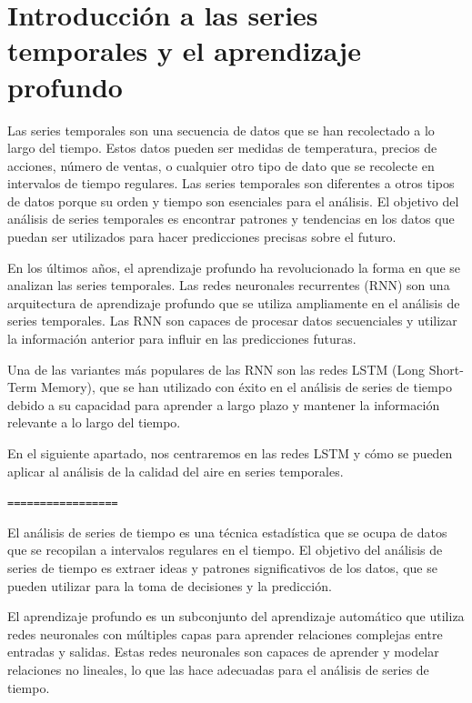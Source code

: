\documentclass[11pt]{article}
\date{}
\title{}
\begin{document}
\setcounter{tocdepth}{3}
\tableofcontents

\setlength\parindent{10pt}


\section{Introducción a las series temporales y el aprendizaje profundo}
\label{sec:org1295288}
Las series temporales son una secuencia de datos que se han
recolectado a lo largo del tiempo. Estos datos pueden ser medidas de
temperatura, precios de acciones, número de ventas, o cualquier otro
tipo de dato que se recolecte en intervalos de tiempo regulares. Las
series temporales son diferentes a otros tipos de datos porque su
orden y tiempo son esenciales para el análisis. El objetivo del
análisis de series temporales es encontrar patrones y tendencias en
los datos que puedan ser utilizados para hacer predicciones precisas
sobre el futuro.

En los últimos años, el aprendizaje profundo ha revolucionado la forma
en que se analizan las series temporales. Las redes neuronales
recurrentes (RNN) son una arquitectura de aprendizaje profundo que se
utiliza ampliamente en el análisis de series temporales. Las RNN son
capaces de procesar datos secuenciales y utilizar la información
anterior para influir en las predicciones futuras.

Una de las variantes más populares de las RNN son las redes LSTM (Long
Short-Term Memory), que se han utilizado con éxito en el análisis de
series de tiempo debido a su capacidad para aprender a largo plazo y
mantener la información relevante a lo largo del tiempo.

En el siguiente apartado, nos centraremos en las redes LSTM y cómo se
pueden aplicar al análisis de la calidad del aire en series
temporales.

\texttt{=================}

El análisis de series de tiempo es una técnica estadística que se
ocupa de datos que se recopilan a intervalos regulares en el
tiempo. El objetivo del análisis de series de tiempo es extraer ideas
y patrones significativos de los datos, que se pueden utilizar para la
toma de decisiones y la predicción.

El aprendizaje profundo es un subconjunto del aprendizaje automático
que utiliza redes neuronales con múltiples capas para aprender
relaciones complejas entre entradas y salidas. Estas redes neuronales
son capaces de aprender y modelar relaciones no lineales, lo que las
hace adecuadas para el análisis de series de tiempo.
\end{document}
